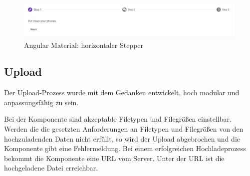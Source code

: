 \begin{figure}
    \centering
    \includegraphics[scale=0.5]{pics/mathorziontalstepper.png}
    \caption{Angular Material: horizontaler Stepper \cite{amStepper}}
    \label{fig:impl:creation:mathorziontalstepper}
\end{figure}

\subsection{Upload}
\label{sec:wizard:upload}
Der Upload-Prozess wurde mit dem Gedanken entwickelt, hoch modular und anpassungsfähig zu sein.

Bei der Komponente sind akzeptable Filetypen und Filegrößen einstellbar. Werden die die gesetzten Anforderungen an Filetypen und Filegrößen von den hochzuladenden Daten nicht erfüllt, so wird der Upload abgebrochen und die Komponente gibt eine Fehlermeldung.
Bei einem erfolgreichen Hochladeprozess bekommt die Komponente eine URL vom Server. Unter der URL ist die hochgeladene Datei erreichbar.

